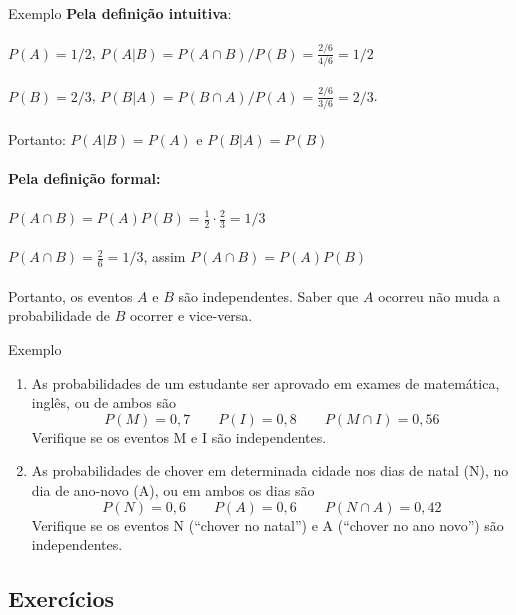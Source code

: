 \documentclass[10pt]{beamer}\usepackage[]{graphicx}\usepackage[]{color}
\theoremstyle{definition}
\begin{document}
\begin{frame}{Exemplo}
  \textbf{Pela definição intuitiva}: \\~\\
  $P(A) = 1/2$, \quad $P(A|B) = P(A\cap B)/P(B) = \frac{2/6}{4/6} =
  1/2$ \\~\\
  $P(B) = 2/3$, \quad $P(B|A) = P(B\cap A)/P(A) = \frac{2/6}{3/6} =
  2/3$. \\~\\
  Portanto: $P(A|B) = P(A)$ e $P(B|A) = P(B)$ \\~\\
  \textbf{Pela definição formal:} \\~\\
  $P(A \cap B) = P(A)P(B) = \frac{1}{2} \cdot \frac{2}{3} = 1/3$ \\~\\
  $P(A \cap B) = \frac{2}{6} = 1/3$, assim $P(A \cap B) = P(A)P(B)$ \\~\\
  Portanto, os eventos $A$ e $B$ são independentes. Saber que $A$
  ocorreu não muda a probabilidade de $B$ ocorrer e vice-versa.
\end{frame}

\begin{frame}{Exemplo}
  \begin{enumerate}
  \item As probabilidades de um estudante ser aprovado em exames de
    matemática, inglês, ou de ambos são
    \begin{equation*}
      P(M) = 0,7 \qquad P(I) = 0,8 \qquad P(M \cap I) = 0,56
    \end{equation*}
    Verifique se os eventos M e I são independentes.
  \item As probabilidades de chover em determinada cidade nos
    dias de natal (N), no dia de ano-novo (A), ou em ambos os dias são
    \begin{equation*}
      P(N) = 0,6 \qquad P(A) = 0,6 \qquad P(N \cap A) = 0,42
    \end{equation*}
    Verifique se os eventos N (``chover no natal'') e A (``chover no ano
    novo'') são independentes.
  \end{enumerate}
\end{frame}

\subsection{Exercícios}
\end{document}
